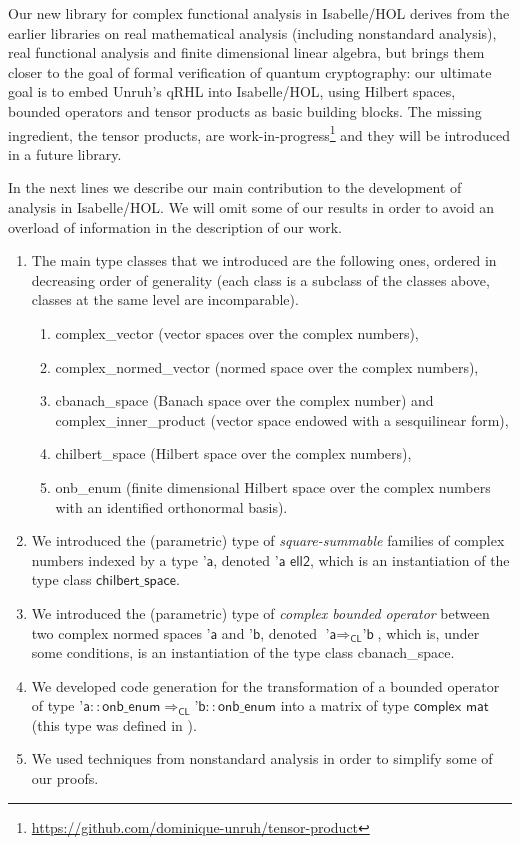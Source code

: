 \documentclass[12pt]{article}
\theoremstyle{definition}
\begin{document}
Our new library for complex functional analysis in Isabelle/HOL derives from the
earlier libraries on real mathematical analysis (including nonstandard analysis), real functional analysis and finite dimensional linear algebra, but brings them closer to the goal of formal verification of quantum cryptography: our ultimate goal is to embed Unruh's qRHL into Isabelle/HOL, using Hilbert spaces, bounded operators and tensor products as basic building blocks. The missing ingredient, the tensor products, are work-in-progress\footnote{\url{https://github.com/dominique-unruh/tensor-product}} and they will be introduced in a future library.

In the next lines we describe our main contribution to the development of analysis in Isabelle/HOL. We will omit some of our results in order to avoid an overload of information in the description of our work.

\begin{enumerate}[label*=\Alph*.]
\item The main type classes that we introduced are the following ones, ordered in decreasing order of generality (each class is a subclass of the classes above, classes at the same level are incomparable).
\begin{enumerate}[label*=\arabic*.]
\item \textsf{complex\_vector} (vector spaces over the complex numbers),
\item \textsf{complex\_normed\_vector} (normed space over the complex numbers), 
\item \textsf{cbanach\_space} (Banach space over the complex number) and \textsf{complex\_inner\_product} (vector space endowed with a sesquilinear form),
\item \textsf{chilbert\_space} (Hilbert space over the complex numbers),
\item \textsf{onb\_enum} (finite dimensional Hilbert space over the complex numbers with an identified orthonormal basis).
\end{enumerate}
\item We introduced the (parametric) type of \emph{square-summable} families of complex numbers indexed by a type $\textsf{'a}$, denoted $\textsf{'a ell2}$, which is an instantiation of the type class $\textsf{chilbert\_space}$.
\item We introduced the (parametric) type of \emph{complex bounded operator} between two complex normed spaces $\textsf{'a}$ and  $\textsf{'b}$, denoted $\textsf{'a} \Rightarrow_{\textsf{CL}} \textsf{'b}$, which is, under some conditions, is an instantiation of the type class \textsf{cbanach\_space}.
\item We developed code generation for the transformation of a bounded operator of type $\textsf{'a}::\textsf{onb\_enum} \Rightarrow_{\textsf{CL}} \textsf{'b}::\textsf{onb\_enum}$ into a matrix of type $\textsf{complex mat}$ (this type was defined in \cite{Jordan_Normal_Form-AFP}).
\item We used techniques from nonstandard analysis in order to simplify some of our proofs.
\end{enumerate}
\end{document}
